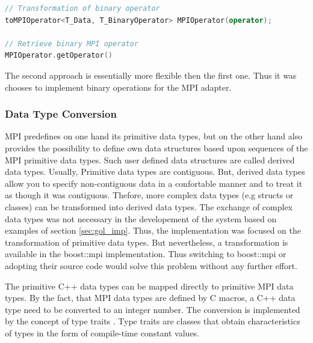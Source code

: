 \begin{lstlisting}[language=C++, caption={ }, label=lst:mpi_bin2]
// Transformation of binary operator
toMPIOperator<T_Data, T_BinaryOperator> MPIOperator(operator);

// Retrieve binary MPI operator
MPIOperator.getOperator()
\end{lstlisting}


The second approach is essentially more flexible then the first
one. Thus it was chooses to implement binary operations for the
MPI adapter.


\subsubsection{Data Type Conversion}
\label{sec:data_type_conversion}
MPI predefines on one hand its primitive data types, but on the other
hand also provides the possibility to define own data structures based
upon sequences of the MPI primitive data types. Such user defined data
structures are called derived data types. Usually, Primitive data
types are contiguous. But, derived data types allow you to specify
non-contiguous data in a confortable manner and to treat it as though
it was contiguous.  Thefore, more complex data types (e.g structs or
classes) can be transformed into derived data types. The exchange
of complex data types was not necessary in the developement of the
system based on examples of section \ref{sec:gol_imp}. Thus, the
implementation was focused on the transformation of primitive data
types.  But nevertheless, a transformation is available in the
boost::mpi \cite{ref:boost_mpi} implementation. Thus switching to
boost::mpi or adopting their source code would solve this problem
without any further effort.

The primitive C++ data types can be mapped directly to primitive MPI
data types. By the fact, that MPI data types are defined by C macros,
a C++ data type need to be converted to an integer number. The
conversion is implemented by the concept of type traits
\cite{ref:type_trait}.  Type traits are classes that obtain
characteristics of types in the form of compile-time constant values.

